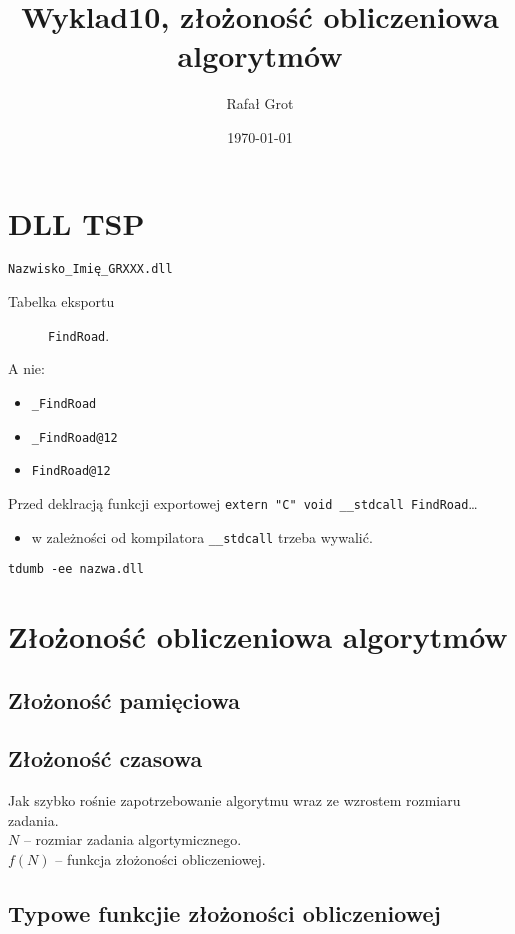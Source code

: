 \documentclass[11pt]{article}
\author{Rafał Grot}
\date{\today}
\title{Wyklad10, złożoność obliczeniowa algorytmów}
\begin{document}
\maketitle
\tableofcontents


\section{DLL TSP}
\label{sec:org8d67b2b}
\texttt{Nazwisko\_Imię\_GRXXX.dll}
\begin{description}
\item[{Tabelka eksportu}] \texttt{FindRoad}.
\end{description}

A nie:
\begin{itemize}
\item \texttt{\_FindRoad}
\item \texttt{\_FindRoad@12}
\item \texttt{FindRoad@12}
\end{itemize}

Przed deklracją funkcji exportowej
\texttt{extern "C" void \_\_stdcall FindRoad}\ldots{}
\begin{itemize}
\item w zależności od kompilatora \texttt{\_\_stdcall} trzeba wywalić.
\end{itemize}

\texttt{tdumb -ee nazwa.dll}
\section{Złożoność obliczeniowa algorytmów}
\label{sec:orgff4d80b}
\subsection{Złożoność pamięciowa}
\label{sec:org1439f05}

\subsection{Złożoność czasowa}
\label{sec:orga1c56ba}
Jak szybko rośnie zapotrzebowanie algorytmu wraz ze wzrostem rozmiaru zadania.\\\empty
\(N\) -- rozmiar zadania algortymicznego.\\\empty
\(f(N)\) -- funkcja złożoności obliczeniowej.
\subsection{Typowe funkcjie złożoności obliczeniowej}
\label{sec:org4f5afdd}
\end{document}
